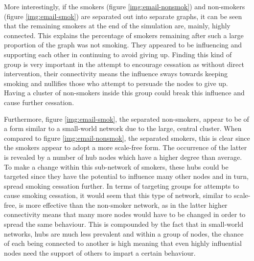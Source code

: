 \documentclass[]{report}
\begin{document}
More interestingly, if the smokers (figure \ref{img:email-nonsmok}) and non-smokers (figure \ref{img:email-smok}) are separated out into separate graphs, it can be seen that the remaining smokers at the end of the simulation are, mainly, highly connected. This explains the percentage of smokers remaining after such a large proportion of the graph was not smoking. They appeared to be influencing and supporting each other in continuing to avoid giving up. Finding this kind of group is very important in the attempt to encourage cessation as without direct intervention, their connectivity means the influence sways towards keeping smoking and nullifies those who attempt to persuade the nodes to give up. Having a cluster of non-smokers inside this group could break this influence and cause further cessation.

Furthermore, figure \ref{img:email-smok}, the separated non-smokers, appear to be of a form similar to a small-world network due to the large, central cluster. When compared to figure \ref{img:email-nonsmok}, the separated smokers, this is clear since the smokers appear to adopt a more scale-free form. The occurrence of the latter is revealed by a number of hub nodes which have a higher degree than average. To make a change within this sub-network of smokers, these hubs could be targeted since they have the potential to influence many other nodes and in turn, spread smoking cessation further. In terms of targeting groups for attempts to cause smoking cessation, it would seem that this type of network, similar to scale-free, is more effective than the non-smoker network, as in the latter higher connectivity means that many more nodes would have to be changed in order to spread the same behaviour. This is compounded by the fact that in small-world networks, hubs are much less prevalent and within a group of nodes, the chance of each being connected to another is high meaning that even highly influential nodes need the support of others to impart a certain behaviour.
\end{document}
